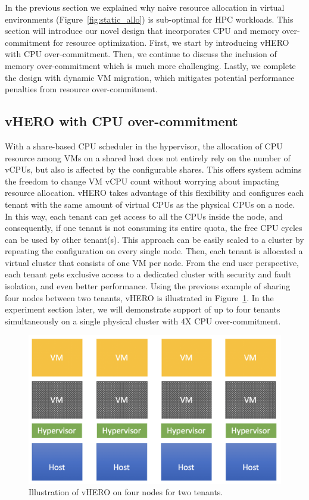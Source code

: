 In the previous section we explained why naive resource allocation in virtual environments (Figure~\ref{fig:static_allo})
is sub-optimal for HPC workloads. This section will introduce our novel design that incorporates 
CPU and memory over-commitment for resource optimization. First, we start by introducing 
vHERO with CPU over-commitment. Then, we continue to discuss the 
inclusion of memory over-commitment which is much more challenging. Lastly, we complete the design 
with dynamic VM migration, which mitigates potential 
performance penalties from resource over-commitment. 

\subsection{vHERO with CPU over-commitment}
With a share-based CPU scheduler in the hypervisor, the allocation of CPU resource among VMs on a 
shared host does not entirely rely on the number of vCPUs, but also is affected by the configurable shares. 
This offers system admins the freedom to 
change VM vCPU count without worrying about impacting resource allocation. vHERO takes advantage of this 
flexibility and configures each tenant with the same amount of virtual CPUs as the physical CPUs 
on a node. In this way, each tenant can get access to all the CPUs inside the node, and consequently, if one tenant 
is not consuming its entire quota, the free CPU cycles can be used by other tenant(s). 
This approach can be easily scaled to a cluster by repeating the configuration on every 
single node. Then, each tenant is allocated a virtual cluster that consists of one VM per node. From the end user 
perspective, each tenant gets exclusive access to a dedicated cluster with security and fault isolation, and even better performance.  
Using the previous example of sharing four nodes between two tenants,  
vHERO is illustrated in Figure~\ref{fig:vtc}. In the experiment section later, we will demonstrate  
support of up to four tenants simultaneously on a single physical cluster with 4X CPU over-commitment.

\begin{figure}[!t]
   \begin{center}
       \includegraphics[width=\columnwidth]{Figures/allocation3}
   \end{center}
   \caption{Illustration of vHERO on four nodes for two tenants.}
   \label{fig:vtc}
 \end{figure}

